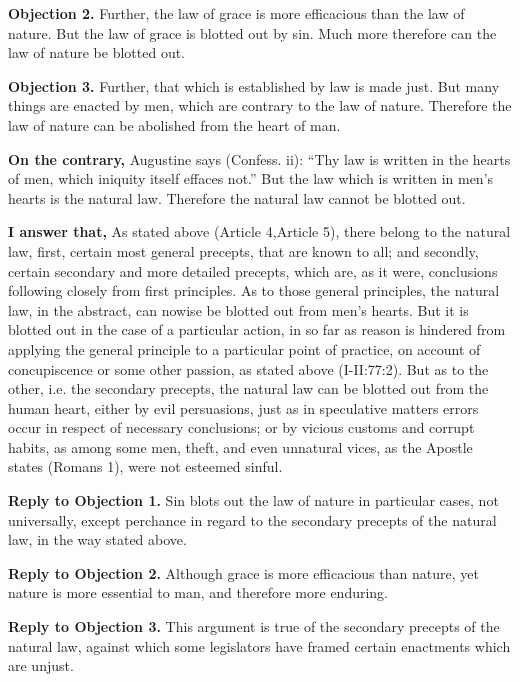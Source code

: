 \textbf{Objection 2.} Further, the law of grace is more efficacious than the law of nature. But the law of grace is blotted out by sin. Much more therefore can the law of nature be blotted out.

\textbf{Objection 3.} Further, that which is established by law is made just. But many things are enacted by men, which are contrary to the law of nature. Therefore the law of nature can be abolished from the heart of man.

\textbf{On the contrary,} Augustine says (Confess. ii): ``Thy law is written in the hearts of men, which iniquity itself effaces not.'' But the law which is written in men's hearts is the natural law. Therefore the natural law cannot be blotted out.

\textbf{I answer that,} As stated above (Article 4,Article 5), there belong to the natural law, first, certain most general precepts, that are known to all; and secondly, certain secondary and more detailed precepts, which are, as it were, conclusions following closely from first principles. As to those general principles, the natural law, in the abstract, can nowise be blotted out from men's hearts. But it is blotted out in the case of a particular action, in so far as reason is hindered from applying the general principle to a particular point of practice, on account of concupiscence or some other passion, as stated above (I-II:77:2). But as to the other, i.e. the secondary precepts, the natural law can be blotted out from the human heart, either by evil persuasions, just as in speculative matters errors occur in respect of necessary conclusions; or by vicious customs and corrupt habits, as among some men, theft, and even unnatural vices, as the Apostle states (Romans 1), were not esteemed sinful.

\textbf{Reply to Objection 1.} Sin blots out the law of nature in particular cases, not universally, except perchance in regard to the secondary precepts of the natural law, in the way stated above.

\textbf{Reply to Objection 2.} Although grace is more efficacious than nature, yet nature is more essential to man, and therefore more enduring.

\textbf{Reply to Objection 3.} This argument is true of the secondary precepts of the natural law, against which some legislators have framed certain enactments which are unjust.



